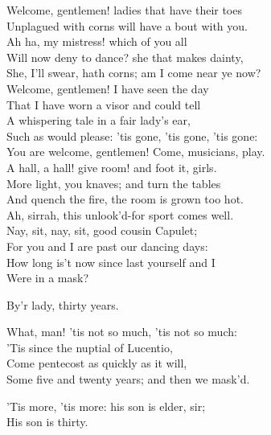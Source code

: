 \begin{speech}
Welcome, gentlemen! ladies that have their toes \\

Unplagued with corns will have a bout with you. \\
Ah ha, my mistress! which of you all \\
Will now deny to dance? she that makes dainty, \\
She, I'll swear, hath corns; am I come near ye now? \\
Welcome, gentlemen! I have seen the day \\
That I have worn a visor and could tell \\
A whispering tale in a fair lady's ear, \\
Such as would please: 'tis gone, 'tis gone, 'tis gone: \\
You are welcome, gentlemen!   Come, musicians, play. \\
A hall, a hall! give room! and foot it, girls. 
\\
More light, you knaves; and turn the tables \\
And quench the fire, the room is grown too hot. \\
Ah, sirrah, this unlook'd-for sport comes well. \\
Nay, sit, nay, sit, good cousin Capulet; \\
For you and I are past our dancing days: \\
How long is't now since last yourself and I \\
Were in a mask? \\
\end{speech}
\begin{speech}
By'r lady, thirty years. \\
\end{speech}
\begin{speech}
What, man! 'tis not so much, 'tis not so much: \\

'Tis since the nuptial of Lucentio, \\
Come pentecost as quickly as it will, \\
Some five and twenty years; and then we mask'd. \\
\end{speech}
\begin{speech}
'Tis more, 'tis more: his son is elder, sir;
\\
His son is thirty. \\
\end{speech}
